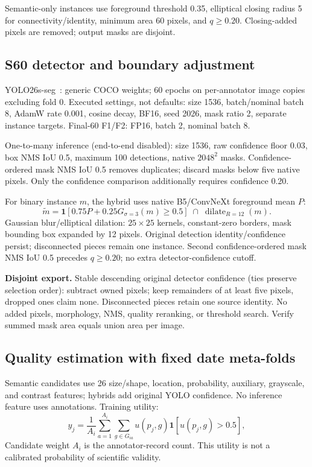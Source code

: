 \documentclass[sigconf]{acmart}
\newcommand{\ind}{\mathbf{1}}
\begin{document}
Semantic-only instances use foreground threshold 0.35, elliptical closing radius 5 for connectivity/identity, minimum area 60 pixels, and $q\geq0.20$. Closing-added pixels are removed; output masks are disjoint.

\subsection{S60 detector and boundary adjustment}
YOLO26s-seg~\cite{ultralytics2026yolo}: generic COCO weights; 60 epochs on per-annotator image copies excluding fold 0. Executed settings, not defaults: size 1536, batch/nominal batch 8, AdamW rate 0.001, cosine decay, BF16, seed 2026, mask ratio 2, separate instance targets. Final-60 F1/F2: FP16, batch 2, nominal batch 8.

One-to-many inference (end-to-end disabled): size 1536, raw confidence floor 0.03, box NMS IoU 0.5, maximum 100 detections, native $2048^2$ masks. Confidence-ordered mask NMS IoU 0.5 removes duplicates; discard masks below five native pixels. Only the confidence comparison additionally requires confidence 0.20.

For binary instance $m$, the hybrid uses native B5/ConvNeXt foreground mean $P$:
\begin{equation}
\widetilde m=\ind[0.75P+0.25G_{\sigma=3}(m)\geq0.5]
\;\cap\;\operatorname{dilate}_{R=12}(m).
\label{eq:refine}
\end{equation}
Gaussian blur/elliptical dilation: $25\times25$ kernels, constant-zero borders, mask bounding box expanded by 12 pixels. Original detection identity/confidence persist; disconnected pieces remain one instance. Second confidence-ordered mask NMS IoU 0.5 precedes $q\geq0.20$; no extra detector-confidence cutoff.

\textbf{Disjoint export.} Stable descending original detector confidence (ties preserve selection order): subtract owned pixels; keep remainders of at least five pixels, dropped ones claim none. Disconnected pieces retain one source identity. No added pixels, morphology, NMS, quality reranking, or threshold search. Verify summed mask area equals union area per image.

\subsection{Quality estimation with fixed date meta-folds}
Semantic candidates use 26 size/shape, location, probability, auxiliary, grayscale, and contrast features; hybrids add original YOLO confidence. No inference feature uses annotations. Training utility:
\begin{equation}
y_j=\frac1{A_i}\sum_{a=1}^{A_i}\sum_{g\in G_{ia}}
u(p_j,g)\ind[u(p_j,g)>0.5],
\end{equation}
Candidate weight $A_i$ is the annotator-record count. This utility is not a calibrated probability of scientific validity.
\end{document}
